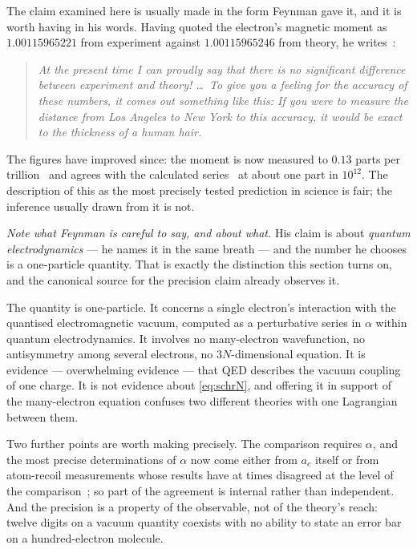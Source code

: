 \documentclass[11pt]{article}
\begin{document}
The claim examined here is usually made in the form Feynman gave it, and it is worth having in his
words. Having quoted the electron's magnetic moment as $1.00115965221$ from experiment against
$1.00115965246$ from theory, he writes~\cite[ch.~1]{FeynmanQED}:
\begin{quote}
\emph{At the present time I can proudly say that there is no significant difference between
experiment and theory! \dots\ To give you a feeling for the accuracy of these numbers, it comes out
something like this: If you were to measure the distance from Los Angeles to New York to this
accuracy, it would be exact to the thickness of a human hair.}
\end{quote}
The figures have improved since: the moment is now measured to $0.13$ parts per
trillion~\cite{Fan2023} and agrees with the calculated series~\cite{Aoyama2019} at about one part
in $10^{12}$. The description of this as the most precisely tested prediction in science is fair;
the inference usually drawn from it is not.

\emph{Note what Feynman is careful to say, and about what.} His claim is about \emph{quantum
electrodynamics} --- he names it in the same breath --- and the number he chooses is a
one-particle quantity. That is exactly the distinction this section turns on, and the canonical
source for the precision claim already observes it.

The quantity is one-particle. It concerns a single electron's interaction with the quantised
electromagnetic vacuum, computed as a perturbative series in $\alpha$ within quantum
electrodynamics. It involves no many-electron wavefunction, no antisymmetry among several
electrons, no $3N$-dimensional equation. It is evidence --- overwhelming evidence --- that QED
describes the vacuum coupling of one charge. It is not evidence about \eqref{eq:schrN}, and
offering it in support of the many-electron equation confuses two different theories with one
Lagrangian between them.

Two further points are worth making precisely. The comparison requires $\alpha$, and the most
precise determinations of $\alpha$ now come either from $a_e$ itself or from atom-recoil
measurements whose results have at times disagreed at the level of the
comparison~\cite{Morel2020,Parker2018}; so part of the agreement is internal rather than
independent. And the precision is a property of the observable, not of the theory's reach:
twelve digits on a vacuum quantity coexists with no ability to state an error bar on a
hundred-electron molecule.
\end{document}
